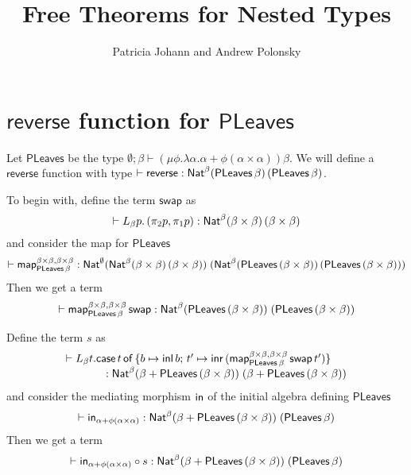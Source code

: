 \documentclass[acmsmall,review,anonymous]{acmart}
\title[Free Theorems for Nested Types]{Free Theorems for 
Nested Types} %
\author{Patricia Johann and Andrew Polonsky}
\affiliation{
  \institution{Appalachian State University}            %
}
\theoremstyle{definition}
\newcommand{\map}{\mathsf{map}}
\begin{document}
\newcommand{\tb}[1]{~~ \mbox{#1} ~~}
\newcommand{\listt}[1]{(\mu \phi. \lambda \beta . \onet + \beta \times \phi \beta) #1}
\newcommand{\filtype}{\Nat^\emptyset 
  \, (\Nat^\emptyset \, \alpha \, \mathit{Bool}) (\Nat^\emptyset \, (\GRose\, \psi\, \alpha) \, (\GRose\, \psi\, (\alpha + \onet)))}
\newcommand{\maplist}{\map_{\lambda A. \setsem{\emptyset; \alpha \vdash List \, \alpha} \rho[\alpha := A]}}

\newcommand{\PLeaves}{\mathsf{PLeaves}}
\newcommand{\swap}{\mathsf{swap}}
\newcommand{\reverse}{\mathsf{reverse}}

\maketitle

\section{$\reverse$ function for $\PLeaves$}

Let $\PLeaves$ be the type $\emptyset; \beta \vdash (\mu \phi. \lambda \alpha. \alpha + \phi(\alpha \times \alpha))\beta$.
We will define a $\reverse$ function with type $\vdash \reverse : \Nat^{\beta} (\PLeaves\,\beta)\,(\PLeaves\,\beta)$.

To begin with, define the term $\swap$ as
\[
	\vdash L_{\beta} p.\, (\pi_2 p, \pi_1 p) : \mathsf{Nat}^{\beta} (\beta \times \beta)\, (\beta \times \beta)
\]
and consider the map for $\PLeaves$
\[
	\vdash \map_{\PLeaves\,\beta}^{\beta \times \beta, \beta \times \beta}
	: \Nat^{\emptyset}
	(\Nat^{\beta} (\beta \times \beta)\, (\beta \times \beta))\;
	(\Nat^{\beta} (\PLeaves\,(\beta \times \beta))\, (\PLeaves\,(\beta \times \beta)))
\]
Then we get a term
\[
	\vdash \map_{\PLeaves\,\beta}^{\beta \times \beta, \beta \times \beta}\, \swap
	: \Nat^{\beta} (\PLeaves\,(\beta \times \beta))\; (\PLeaves\,(\beta \times \beta))
\]

Define the term $s$ as
\[
\begin{array}{l}
	\vdash L_{\beta} t. \case{t}{b \mapsto \inl\, b}{t' \mapsto \inr\,( \map_{\PLeaves\,\beta}^{\beta \times \beta, \beta \times \beta}\, \swap\, t' )} \\
	\hspace*{0.5in} : \Nat^{\beta} (\beta + \PLeaves\,(\beta \times \beta))\;  (\beta + \PLeaves\,(\beta \times \beta))
\end{array}
\]
and consider the mediating morphism $\mathsf{in}$ of the initial algebra defining $\PLeaves$
\[
	\vdash \tin_{\alpha + \phi(\alpha \times \alpha)}
	: \Nat^{\beta} (\beta + \PLeaves\,(\beta \times \beta)) \; (\PLeaves\, \beta)
\]
Then we get a term
\[
	\vdash \tin_{\alpha + \phi(\alpha \times \alpha)} \circ s
	: \Nat^{\beta} (\beta + \PLeaves\,(\beta \times \beta)) \; (\PLeaves\,\beta)
\]
\end{document}
